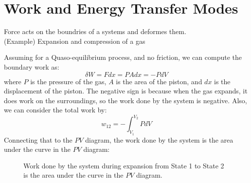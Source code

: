 \documentclass[11pt]{report}
\begin{document}
\section{Work and Energy Transfer Modes}
\begin{definition}
    Force acts on the boundries of a systems and deformes them. \\
    (Example) Expansion and compression of a gas 

    Assuming for a Quaso-equilibrium process, and no friction, we can compute the boundary work as:
    \begin{equation}
        \delta W = F dx  = P A dx = - P dV
    \end{equation}
    where $P$ is the pressure of the gas, $A$ is the area of the piston, and $dx$ is the displacement of the piston. The negative sign is because when the gas expands, it does work on the surroundings, so the work done by the system is negative. Also, we can consider the total work by:
    \begin{equation}
        w_{12} = -\int_{V_1}^{V_2} P dV
    \end{equation}
     Connecting that to the $PV$ diagram, the work done by the system is the area under the curve in the $PV$ diagram:

\begin{figure}[h!]
    \centering
    \caption{Work done by the system during expansion from State 1 to State 2 is the area under the curve in the $PV$ diagram.}
\end{figure}

\end{definition}
\newpage
\end{document}
